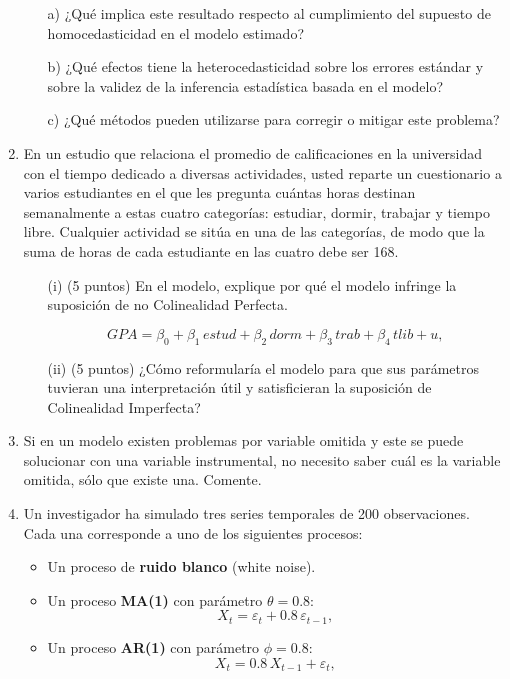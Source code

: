 \documentclass[10pt,a4paper]{article}
\begin{document}
\begin{enumerate}
\begin{enumerate}
  \item[a)] ¿Qué implica este resultado respecto al cumplimiento del supuesto de homocedasticidad en el modelo estimado?
  \item[b)] ¿Qué efectos tiene la heterocedasticidad sobre los errores estándar y sobre la validez de la inferencia estadística basada en el modelo?
  \item[c)] ¿Qué métodos pueden utilizarse para corregir o mitigar este problema?
\end{enumerate}

    \item En un estudio que relaciona el promedio de calificaciones en la universidad con el tiempo dedicado a diversas actividades, usted reparte un cuestionario a varios estudiantes en el que les pregunta cuántas horas destinan semanalmente a estas cuatro categorías: estudiar, dormir, trabajar y tiempo libre. Cualquier actividad se sitúa en una de las categorías, de modo que la suma de horas de cada estudiante en las cuatro debe ser 168.

\begin{enumerate}
    \item[(i)] (5 puntos) En el modelo, explique por qué el modelo infringe la suposición de no Colinealidad Perfecta.

    \[
        GPA = \beta_0 + \beta_1 \, estud + \beta_2 \, dorm + \beta_3 \, trab + \beta_4 \, tlib + u,
    \]

    \item[(ii)] (5 puntos) ¿Cómo reformularía el modelo para que sus parámetros tuvieran una interpretación  útil y satisficieran la suposición de Colinealidad Imperfecta?

\end{enumerate}

    
    \item Si en un modelo existen problemas por variable omitida y este se puede solucionar con una variable instrumental, no necesito saber cuál es la variable omitida, sólo que existe una. Comente.\\

    
    \item Un investigador ha simulado tres series temporales de 200 observaciones. 
Cada una corresponde a uno de los siguientes procesos:

\begin{itemize}
    \item Un proceso de \textbf{ruido blanco} (white noise).
    \item Un proceso \textbf{MA(1)} con parámetro $\theta = 0.8$:
    \[
        X_t = \varepsilon_t + 0.8\,\varepsilon_{t-1},
    \]
    \item Un proceso \textbf{AR(1)} con parámetro $\phi = 0.8$:
    \[
        X_t = 0.8\,X_{t-1} + \varepsilon_t,
    \]
\end{itemize}


\end{enumerate}
\end{document}
